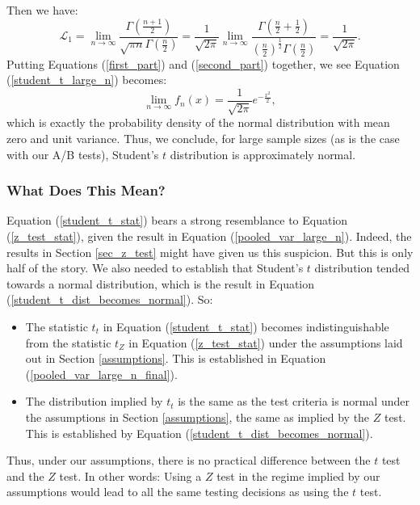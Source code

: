 \documentclass{article}
\numberwithin{equation}{section}
\begin{document}
Then we have:
\begin{equation} \label{first_part} 
	\mathcal{L}_1= \lim_{n\rightarrow \infty} \frac{\Gamma\left(\frac{n+1}{2}\right)}{\sqrt{\pi n} \Gamma\left(\frac{n}{2}\right)} =  \frac{1}{\sqrt{2\pi}}\lim_{n\rightarrow \infty} \frac{\Gamma\left(\frac{n}{2}+\frac{1}{2}\right)}{\left(\frac{n}{2}\right)^{\frac{1}{2}} \Gamma\left(\frac{n}{2}\right)} = \frac{1}{\sqrt{2\pi}}.
\end{equation}
Putting Equations (\ref{first_part}) and (\ref{second_part}) together, we see Equation (\ref{student_t_large_n}) becomes:
\begin{equation} \label{student_t_dist_becomes_normal}
	\lim_{n\rightarrow \infty}f_n(x) = \frac{1}{\sqrt{2\pi}} e^{-\frac{x^2}{2}},
\end{equation}
which is exactly the probability density of the normal distribution with mean zero and unit variance. Thus, we conclude, for large sample sizes (as is the case with our A/B tests), Student's $t$ distribution is approximately normal.

\subsubsection{What Does This Mean?}
Equation (\ref{student_t_stat}) bears a strong resemblance to Equation (\ref{z_test_stat}), given the result in Equation (\ref{pooled_var_large_n}). Indeed, the results in Section \ref{sec_z_test} might have given us this suspicion. But this is only half of the story. We also needed to establish that Student's $t$ distribution tended towards a normal distribution, which is the result in Equation (\ref{student_t_dist_becomes_normal}).  So:
\begin{itemize}
	\item The statistic $t_t$ in Equation (\ref{student_t_stat}) becomes indistinguishable from the statistic $t_Z$ in Equation (\ref{z_test_stat}) under the assumptions laid out in Section \ref{assumptions}. This is established in Equation (\ref{pooled_var_large_n_final}).
	\item The distribution implied by $t_t$ is the same as the test criteria is normal under the assumptions in Section \ref{assumptions}, the same as implied by the $Z$ test. This is established by Equation (\ref{student_t_dist_becomes_normal}).
\end{itemize}
Thus, under our assumptions, there is no practical difference between the $t$ test and the $Z$ test. In other words: Using a $Z$ test in the regime implied by our assumptions would lead to all the same testing decisions as using the $t$ test.
\end{document}
